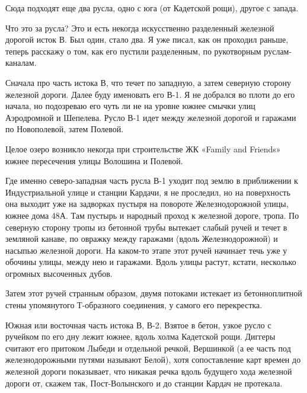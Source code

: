Сюда подходят еще два русла, одно с юга (от Кадетской рощи), другое с запада.

Что это за русла? Это и есть некогда искусственно разделенный железной дорогой исток В. Был один, стало два. Я уже писал, как он проходил раньше, теперь расскажу о том, как его пустили разделенным, по рукотворным руслам-каналам. 

Сначала про часть истока В, что течет по западную, а затем северную сторону железной дороги. Далее буду именовать его В-1. Я не добрался во плоти до его начала, но подозреваю его чуть ли не на уровне южнее смычки улиц Аэродромной и Шепелева. Русло В-1 идет между железной дорогой и гаражами по Новополевой, затем Полевой. 

Целое озеро возникло некогда при строительстве ЖК «Family and Friends» южнее пересечения улицы Волошина и Полевой.

Где именно северо-западная часть русла В-1 уходит под землю в приближении к Индустриальной улице и станции Кардачи, я не проследил, но на поверхность она выходит уже на задворках пустыря на повороте Железнодорожной улицы, южнее дома 48А. Там пустырь и народный проход к железной дороге, тропа. По северную сторону тропы из бетонной трубы вытекает слабый ручей и течет в земляной канаве, по овражку между гаражами (вдоль Железнодорожной) и насыпью железной дороги. На каком-то этапе этот ручей начинает течь уже у обочины улицы, между нею и гаражами. Вдоль улицы растут, кстати, несколько огромных высоченных дубов.

Затем этот ручей странным образом, двумя потоками истекает из бетонноплитной стены упомянутого Т-образного соединения, у самого его перекрестка.

Южная или восточная часть истока В, В-2.
Взятое в бетон, узкое русло с ручейком по его дну лежит южнее, вдоль холма Кадетской рощи. Диггеры считают его притоком Лыбеди и отдельной речкой, Вершинкой (а ее часть под железнодорожными путями называют Белой), хотя сопоставление карт времен до железной дороги показывает, что никакая речка вдоль будущего хода железной дороги от, скажем так, Пост-Волынского и до станции Кардач не протекала.


